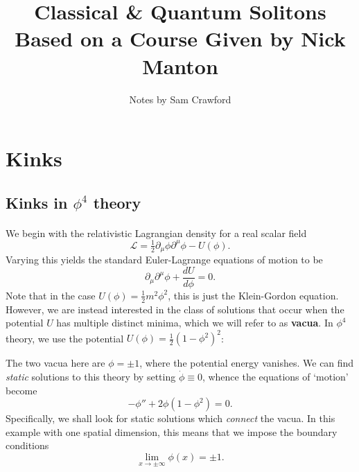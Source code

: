 \documentclass[11pt, fleqn]{article}
\begin{document}
	\title{Classical \& Quantum Solitons\\
	\large{Based on a Course Given by Nick Manton}}
	\author{Notes by Sam Crawford}
	\maketitle

\tableofcontents

\section{Kinks}

\subsection{Kinks in $ \phi^4 $ theory}


\paragraph{} We begin with the relativistic Lagrangian density for a real scalar field
	\begin{equation}\label{key}
		\mathcal{L} = \tfrac{1}{2} \partial_\mu \phi \partial^\mu \phi - U(\phi) .
	\end{equation}
Varying this yields the standard Euler-Lagrange equations of motion to be
	\begin{equation}\label{eq:scalarField}
		\partial_\mu \partial^\mu \phi + \frac{d U}{d \phi} = 0.
	\end{equation}
Note that in the case $ U(\phi) = \tfrac{1}{2} m^2 \phi^2 $, this is just the Klein-Gordon equation. However, we are instead interested in the class of solutions that occur when the potential $ U $ has multiple distinct minima, which we will refer to as \textbf{vacua}. In $ \phi^4 $ theory, we use the potential $ U(\phi) = \tfrac{1}{2} (1 - \phi^2)^2 $:

\begin{center}
	
\end{center}

The two vacua here are $ \phi = \pm 1 $, where the potential energy vanishes. We can find \textit{static} solutions to this theory by setting $ \dot{\phi} \equiv 0 $, whence the equations of `motion' become
	\begin{equation}\label{key}
		-\phi '' + 2 \phi (1- \phi^2) = 0.
	\end{equation}
Specifically, we shall look for static solutions which \textit{connect} the vacua. In this example with one spatial dimension, this means that we impose the boundary conditions
	\begin{equation}\label{key}
		\lim_{x \to \pm \infty} \phi(x) = \pm 1.
	\end{equation}
\end{document}
